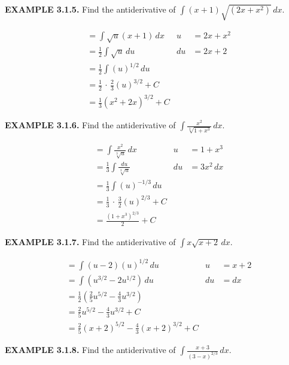 \documentclass[12pt]{article}
\newcommand{\follow}{\bigskip\noindent}
\newcommand{\point}{\,\cdot\,}
\newcommand{\mins}{-}
\newcommand{\inline}[1]{\({#1}\)}
\begin{document}
        \follow\textbf{EXAMPLE 3.1.5.}
        Find the antiderivative of \inline{\int{} (x + 1) \sqrt{(2x + x^2)} \, dx}.
        
        \begin{align*}
            &= \int{} \sqrt{u} (x + 1) \, dx                        & u &= 2x + x^2 \\
            &= \frac{1}{2} \int{} \sqrt{u} \, du                    & du &= 2x + 2 \\
            &= \frac{1}{2} \int{} {(u)}^{1/2} \, du \\
            &= \frac{1}{2} \point{} \frac{2}{3} {(u)}^{3/2} + C \\
            &= \frac{1}{3} {(x^2 + 2x)}^{3/2} + C
        \end{align*}

        \newpage\follow\textbf{EXAMPLE 3.1.6.}
        Find the antiderivative of \inline{\int{} \frac{x^2}{\sqrt[3]{1 + x^3}} \, dx}.

        \begin{align*}
            &= \int{} \frac{x^2}{\sqrt[3]{u}} \, dx                 & u &= 1 + x^3 \\
            &= \frac{1}{3} \int{} \frac{du}{\sqrt[3]{u}}            & du &= 3x^2 \, dx \\
            &= \frac{1}{3} \int{} {(u)}^{\mins 1/3} \, du \\
            &= \frac{1}{3} \point{} \frac{3}{2} {(u)}^{2/3} + C \\
            &= \frac{{(1 + x^3)}^{2/3}}{2} + C
        \end{align*}

        \follow\textbf{EXAMPLE 3.1.7.}
        Find the antiderivative of \inline{\int{} x \sqrt{x + 2} \, dx}.
        
        \begin{align*}
            &= \int{} (u \mins{} 2) {(u)}^{1/2} \, du       & u &= x + 2 \\
            &= \int{} (u^{3/2} \mins{} 2u^{1/2}) \, du      & du &= dx \\
            &= \frac{1}{2} \left(\frac{2}{5} u^{5/2} \mins{} \frac{4}{3} u^{3/2}\right) \\
            &= \frac{2}{5} u^{5/2} \mins{} \frac{4}{3} u^{3/2} + C \\
            &= \frac{2}{5} {(x + 2)}^{5/2} \mins{} \frac{4}{3} {(x + 2)}^{3/2} + C
        \end{align*}

        \follow\textbf{EXAMPLE 3.1.8.}
        Find the antiderivative of \inline{\int{} \frac{x + 3}{{(3 \mins{} x)}^{2/3}} \, dx}.
\end{document}
